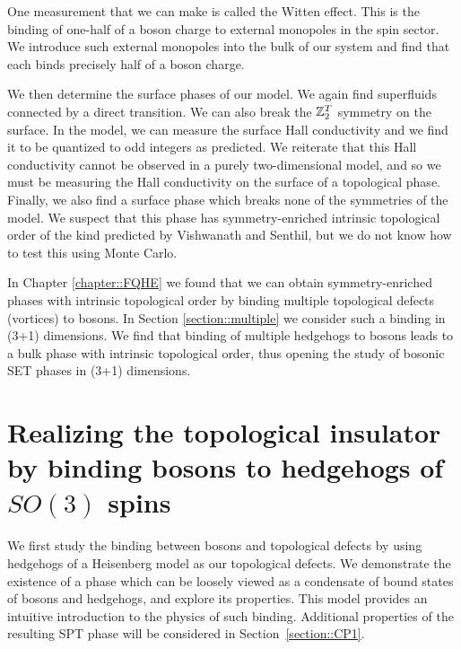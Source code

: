 One measurement that we can make is called the Witten effect.\cite{MaxWitten, Max, YeWen2014, YeWang2014} This is the binding of one-half of a boson charge to external monopoles in the spin sector. We introduce such external monopoles into the bulk of our system and find that each binds precisely half of a boson charge.

We then determine the surface phases of our model. We again find superfluids connected by a direct transition.  We can also break the $\mathbb{Z}_2^T$ symmetry on the surface. In the \cp model, we can measure the surface Hall conductivity and we find it to be quantized to odd integers as predicted. We reiterate that this Hall conductivity cannot be observed in a purely two-dimensional model, and so we must be measuring the Hall conductivity on the surface of a topological phase. Finally, we also find a surface phase which breaks none of the symmetries of the model. We suspect that this phase has symmetry-enriched intrinsic topological order of the kind predicted by Vishwanath and Senthil,\cite{SenthilVishwanath} but we do not know how to test this using Monte Carlo.

In Chapter \ref{chapter::FQHE} we found that we can obtain symmetry-enriched phases with intrinsic topological order by binding multiple topological defects (vortices) to bosons. In Section \ref{section::multiple} we consider such a binding in (3+1) dimensions. We find that binding of multiple hedgehogs to bosons leads to a bulk phase with intrinsic topological order, thus opening the study of bosonic SET phases in (3+1) dimensions. 

\section{Realizing the topological insulator by binding bosons to hedgehogs of $SO(3)$ spins}
\label{section::Heisenberg}

We first study the binding between bosons and topological defects by using hedgehogs of a Heisenberg model as our topological defects. We demonstrate the existence of a phase which can be loosely viewed as a condensate of bound states of bosons and hedgehogs, and explore its properties. This model provides an intuitive introduction to the physics of such binding. Additional properties of the resulting SPT phase will be considered in Section~\ref{section::CP1}.

